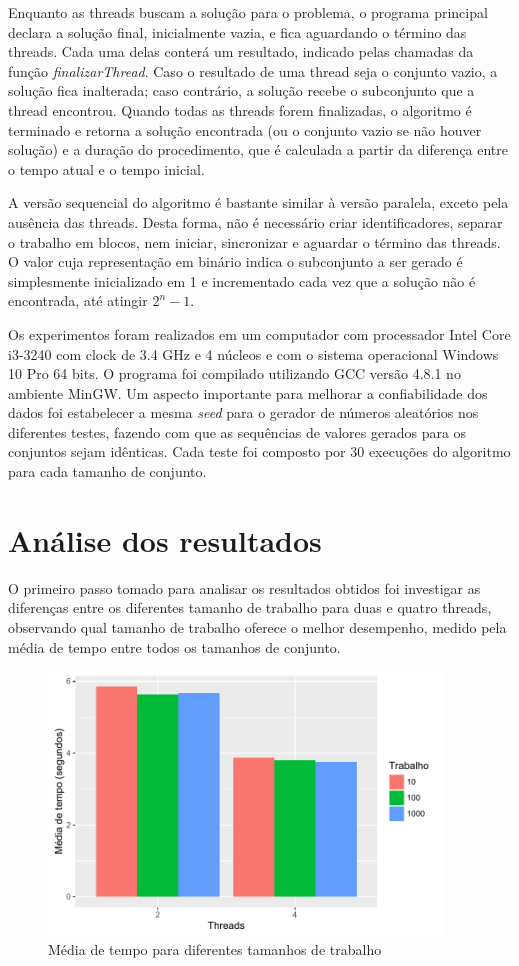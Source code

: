 \documentclass[12pt]{article}
\begin{document}
Enquanto as threads buscam a solução para o problema, o programa principal declara a solução final, inicialmente vazia, e fica aguardando o término das threads. Cada uma delas conterá um resultado, indicado pelas chamadas da função \textit{finalizarThread}. Caso o resultado de uma thread seja o conjunto vazio, a solução fica inalterada; caso contrário, a solução recebe o subconjunto que a thread encontrou. Quando todas as threads forem finalizadas, o algoritmo é terminado e retorna a solução encontrada (ou o conjunto vazio se não houver solução) e a duração do procedimento, que é calculada a partir da diferença entre o tempo atual e o tempo inicial.

A versão sequencial do algoritmo é bastante similar à versão paralela, exceto pela ausência das threads. Desta forma, não é necessário criar identificadores, separar o trabalho em blocos, nem iniciar, sincronizar e aguardar o término das threads. O valor cuja representação em binário indica o subconjunto a ser gerado é simplesmente inicializado em 1 e incrementado cada vez que a solução não é encontrada, até atingir $2^{n} - 1$.

Os experimentos foram realizados em um computador com processador Intel Core i3-3240 com clock de 3.4 GHz e 4 núcleos e com o sistema operacional Windows 10 Pro 64 bits. O programa foi compilado utilizando GCC versão 4.8.1 no ambiente MinGW. Um aspecto importante para melhorar a confiabilidade dos dados foi estabelecer a mesma \textit{seed} para o gerador de números aleatórios nos diferentes testes, fazendo com que as sequências de valores gerados para os conjuntos sejam idênticas. Cada teste foi composto por 30 execuções do algoritmo para cada tamanho de conjunto.

\section{Análise dos resultados} \label{sec:results}

O primeiro passo tomado para analisar os resultados obtidos foi investigar as diferenças entre os diferentes tamanho de trabalho para duas e quatro threads, observando qual tamanho de trabalho oferece o melhor desempenho, medido pela média de tempo entre todos os tamanhos de conjunto.

\begin{figure}[ht]
    \centering
    \includegraphics[width=10.5cm]{chunks}
    \caption{Média de tempo para diferentes tamanhos de trabalho}
    \label{fig:chunks}
\end{figure}
\end{document}
